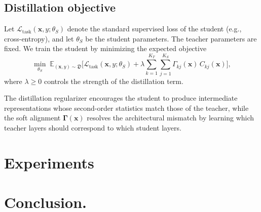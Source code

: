 \documentclass[11pt]{article}
\begin{document}
\subsection{Distillation objective}

Let \(\mathcal{L}_{\text{task}}(\mathbf{x},y;\theta_S)\) denote the standard supervised loss of the student (e.g., cross-entropy),
and let \(\theta_S\) be the student parameters. The teacher parameters are fixed.
We train the student by minimizing the expected objective
\[
\min_{\theta_S}\;
\mathbb{E}_{(\mathbf{x},y)\sim\mathfrak{D}}
\Big[
\mathcal{L}_{\text{task}}(\mathbf{x},y;\theta_S)
+
\lambda
\sum_{k=1}^{K_T}\sum_{j=1}^{K_S}
\Gamma_{kj}(\mathbf{x})\, C_{kj}(\mathbf{x})
\Big],
\]
where \(\lambda\ge 0\) controls the strength of the distillation term.

The distillation regularizer encourages the student to produce intermediate representations whose second-order statistics match those of the teacher,
while the soft alignment \(\boldsymbol{\Gamma}(\mathbf{x})\) resolves the architectural mismatch by learning which teacher layers should correspond to which student layers.


\section{Experiments}


\section{Conclusion.} 



\end{document}
